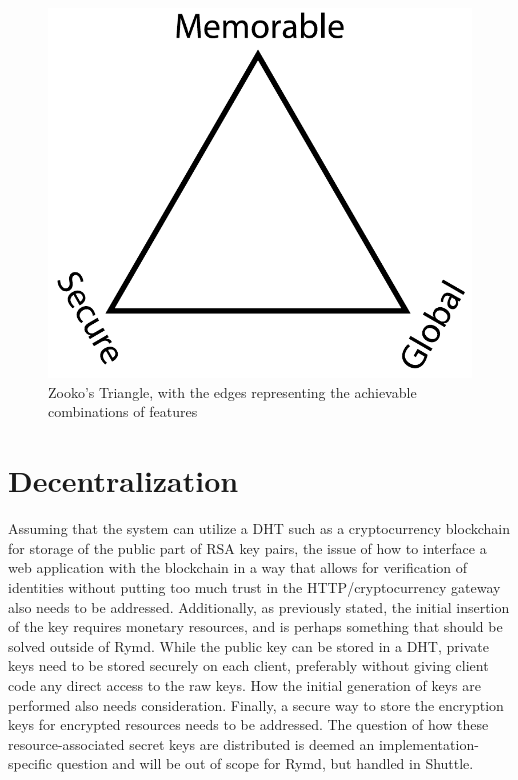 \begin{figure}[h]
\centering
\includegraphics[width=\textwidth,height=0.2\paperheight,keepaspectratio
]{figures/Zooko_s_Triangle}
\caption{Zooko's Triangle, with the edges representing the achievable combinations of features \cite{Zooko:2001:Online}}
\label{fig:zooko}
\end{figure}

\section{Decentralization}

Assuming that the system can utilize a DHT such as a cryptocurrency blockchain for storage of the public part of RSA key pairs, the issue of how to interface a web application with the blockchain in a way that allows for verification of identities without putting too much trust in the HTTP/cryptocurrency gateway also needs to be addressed. Additionally, as previously stated, the initial insertion of the key requires monetary resources, and is perhaps something that should be solved outside of Rymd.
While the public key can be stored in a DHT, private keys need to be stored securely on each client, preferably without giving client code any direct access to the raw keys. How the initial generation of keys are performed also needs consideration. Finally, a secure way to store the encryption keys for encrypted resources needs to be addressed. The question of how these resource-associated secret keys are distributed is deemed an implementation-specific question and will be out of scope for Rymd, but handled in Shuttle.

